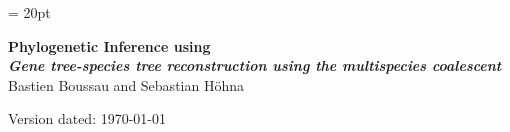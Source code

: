\documentclass[11pt]{article}
\begin{document}
\renewcommand{\headrulewidth}{0.5pt}
\headsep = 20pt
\lhead{ }

\thispagestyle{plain}
\begin{center}

\textbf{\LARGE Phylogenetic Inference using \RevBayes}\\\vspace{2mm}
\textbf{\it{\Large Gene tree-species tree reconstruction using the multispecies coalescent}}\\\vspace{2mm}
\vspace{1cm}
{\Large Bastien Boussau and Sebastian H{\"o}hna}
\vspace{1cm}
\end{center}

\def \ResourcePath {./}
\def \GlobalResourcePath {../}


Version dated: \today
\end{document}
